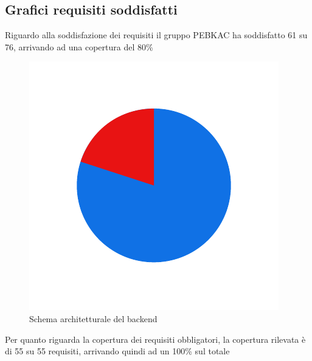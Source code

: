 \subsection{Grafici requisiti soddisfatti}
Riguardo alla soddisfazione dei requisiti il gruppo PEBKAC ha soddisfatto 61 su 76,
arrivando ad una copertura del 80\%
\begin{figure}[H]
    \centering
    \includegraphics[width=\textwidth]{images/requisiti_tot.png}
    \caption{Schema architetturale del backend}
    \label{fig:Requisiti Totali}
\end{figure}
\newpage
Per quanto riguarda la copertura dei requisiti obbligatori, la copertura rilevata è di 55 su 55
requisiti, arrivando quindi ad un 100\% sul totale

